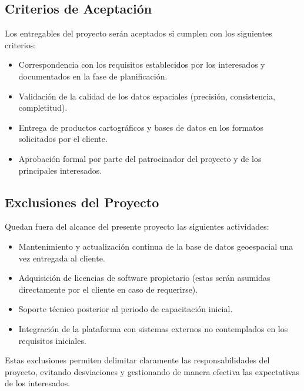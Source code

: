\subsection{Criterios de Aceptación}

Los entregables del proyecto serán aceptados si cumplen con los siguientes criterios:

\begin{itemize}
  \item Correspondencia con los requisitos establecidos por los interesados y documentados en la fase de planificación.
  \item Validación de la calidad de los datos espaciales (precisión, consistencia, completitud).
  \item Entrega de productos cartográficos y bases de datos en los formatos solicitados por el cliente.
  \item Aprobación formal por parte del patrocinador del proyecto y de los principales interesados.
\end{itemize}

\subsection{Exclusiones del Proyecto}

Quedan fuera del alcance del presente proyecto las siguientes actividades:

\begin{itemize}
  \item Mantenimiento y actualización continua de la base de datos geoespacial una vez entregada al cliente.
  \item Adquisición de licencias de software propietario (estas serán asumidas directamente por el cliente en caso de requerirse).
  \item Soporte técnico posterior al periodo de capacitación inicial.
  \item Integración de la plataforma con sistemas externos no contemplados en los requisitos iniciales.
\end{itemize}

Estas exclusiones permiten delimitar claramente las responsabilidades del proyecto, evitando desviaciones y gestionando de manera efectiva las expectativas de los interesados.